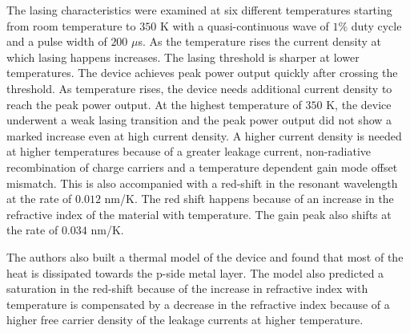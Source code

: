 \documentclass{article}
\begin{document}
The lasing characteristics were examined at six different temperatures 
starting from room temperature to $350$ K with a quasi-continuous wave of $1\%$
duty cycle and a pulse width of $200$ $\mu$s. As the temperature rises the
current density at which lasing happens increases. The lasing threshold is
sharper at lower temperatures. The device achieves peak power output quickly 
after crossing the threshold. As temperature rises, the device needs additional
current density to reach the peak power output. At the highest temperature of
$350$ K, the device underwent a weak lasing transition and the peak power output
did not show a marked increase even at high current density. A higher
current density is needed at higher temperatures because of a greater leakage
current, non-radiative recombination of charge carriers and a temperature
dependent gain mode offset mismatch. This is also accompanied with a red-shift 
in the resonant wavelength at the rate of $0.012$ nm/K. The red shift happens
because of an increase in the refractive index of the material with temperature.
The gain peak also shifts at the rate of $0.034$ nm/K.

The authors also built a thermal model of the device and found that most of 
the heat is dissipated towards the p-side metal layer. The model also predicted
a saturation in the red-shift because of the increase in refractive index with
temperature is compensated by a decrease in the refractive index because of a
higher free carrier density of the leakage currents at higher temperature.
\end{document}
